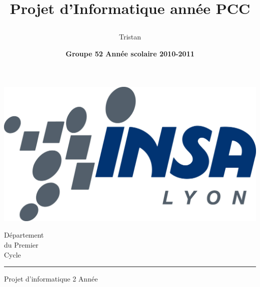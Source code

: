 \documentclass[12pt,twoside,a4paper,leqno,titlepage]{report}
\author{Tristan \bsc{Pourcelot}}
\title{\begin{center} \textbf{\Huge{Projet d'Informatique \newline 2\up{\`eme} ann\'ee PCC}} \end{center}}
\date{\textbf{ Groupe 52 \hspace{\stretch{1}} Ann\'ee scolaire 2010-2011  }}
\begin{document}
\begin{minipage}[c]{0.5\linewidth}
\includegraphics[bb=0 75 200 100, scale=0.3]{../images/insa-couleur.jpg}
\end{minipage}
\begin{minipage}[r]{0.5\linewidth}
\vspace*{25pt}
\begin{flushright}
\LARGE D\'epartement \\ du Premier \\ Cycle \\ \rule{\linewidth}{2pt}
\end{flushright}
\end{minipage}

\vspace*{1cm}

\begin{center}
\LARGE Projet d'informatique 2  Ann\'ee\\
\end{center}
\vspace*{1.3cm}
	
\setlength\fboxrule{2pt}
\end{document}
